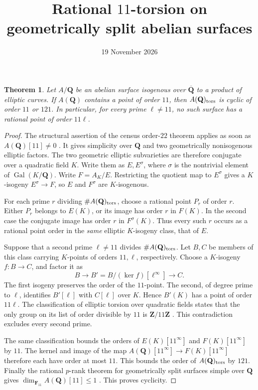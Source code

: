 \documentclass[11pt]{article}
\title{Rational \(11\)-torsion on geometrically split abelian surfaces}
\author{}
\date{19 November 2026}
\newcommand{\Q}{\mathbf Q}
\newcommand{\F}{\mathbf F}
\newtheorem*{theorem}{Theorem}
\begin{document}
\maketitle

\begin{theorem}
Let \(A/\Q\) be an abelian surface isogenous over \(\overline{\Q}\) to a product of elliptic curves. If \(A(\Q)\) contains a point of order \(11\), then \(A(\Q)_{\rm tors}\) is cyclic of order \(11\) or \(121\). In particular, for every prime \(\ell\ne 11\), no such surface has a rational point of order \(11\ell\).
\end{theorem}

\begin{proof}
The structural assertion of the census order-\(22\) theorem applies as soon as \(A(\Q)[11]\ne 0\) \cite{C22}. It gives simplicity over \(\Q\) and two geometrically nonisogenous elliptic factors. The two geometric elliptic subvarieties are therefore conjugate over a quadratic field \(K\). Write them as \(E,E^\sigma\), where \(\sigma\) is the nontrivial element of \(\operatorname{Gal}(K/\Q)\). Write \(F=A_K/E\). Restricting the quotient map to \(E^\sigma\) gives a \(K\)-isogeny \(E^\sigma\to F\), so \(E\) and \(F^\sigma\) are \(K\)-isogenous.

For each prime \(r\) dividing \(\# A(\Q)_{\rm tors}\), choose a rational point \(P_r\) of order \(r\). Either \(P_r\) belongs to \(E(K)\), or its image has order \(r\) in \(F(K)\). In the second case the conjugate image has order \(r\) in \(F^\sigma(K)\). Thus every such \(r\) occurs as a rational point order in the \emph{same} elliptic \(K\)-isogeny class, that of \(E\).

Suppose that a second prime \(\ell\ne 11\) divides \(\# A(\Q)_{\rm tors}\). Let \(B,C\) be members of this class carrying \(K\)-points of orders \(11,\ell\), respectively. Choose a \(K\)-isogeny \(f:B\to C\), and factor it as
\[
 B \longrightarrow B'=B/(\ker f)[\ell^\infty]\longrightarrow C .
\]
The first isogeny preserves the order of the \(11\)-point. The second, of degree prime to \(\ell\), identifies \(B'[\ell]\) with \(C[\ell]\) over \(K\). Hence \(B'(K)\) has a point of order \(11\ell\). The classification of elliptic torsion over quadratic fields states that the only group on its list of order divisible by \(11\) is \(\mathbf Z/11\mathbf Z\) \cite[Theorem 1]{KN}. This contradiction excludes every second prime.

The same classification bounds the orders of \(E(K)[11^\infty]\) and \(F(K)[11^\infty]\) by \(11\). The kernel and image of the map \(A(\Q)[11^\infty]\to F(K)[11^\infty]\) therefore each have order at most \(11\). This bounds the order of \(A(\Q)_{\rm tors}\) by \(121\). Finally the rational \(p\)-rank theorem for geometrically split surfaces simple over \(\Q\) gives \(\dim_{\F_{11}} A(\Q)[11]\le 1\) \cite{Rank}. This proves cyclicity.
\end{proof}
\end{document}
